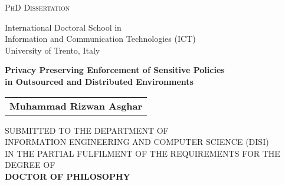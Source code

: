 \documentclass[epsfig,a4paper,11pt,titlepage]{book}
\newcommand{\clearemptydoublepage}{\newpage{\pagestyle{empty}\cleardoublepage}}
\numberwithin{algorithm}{chapter}
\newenvironment{changemargin}[3]{\begin{list}{}{\setlength{\topsep}{0pt}\setlength{\leftmargin}{#1}\setlength{\rightmargin}{#2}\setlength{\topmargin}{#3}\setlength{\listparindent}{\parindent}\setlength{\itemindent}{\parindent}\setlength{\parsep}{\parskip}}\item[]}{\end{list}}
\begin{document}
\newpage
\clearemptydoublepage
\thispagestyle{empty}
\begin{changemargin}{-7mm}{-7mm}{0mm}
\begin{center}

\Large \textsc{PhD Dissertation} \\ \tiny

\hrulefill 


\begin{figure}[h!]
\vspace{4mm}
  \centerline{}
\end{figure}

\Large International Doctoral School in \\ Information and Communication Technologies (ICT) \\
\Large University of Trento, Italy \\

\vspace{7mm}

\LARGE\textbf{Privacy Preserving Enforcement of Sensitive Policies \\ in Outsourced and Distributed Environments}

\vspace{2mm}

\begin{center}
\begin{tabular}{l}
\Large \textbf{Muhammad Rizwan Asghar} \\
\end{tabular}
\end{center}

\vspace{5mm}

{\normalsize \uppercase{
submitted to the Department of \\ Information Engineering and Computer Science (DISI) \\
in the partial fulfilment of the requirements for the degree of \\
\textbf{Doctor of Philosophy}
}
}

\vspace{13mm}


\end{center}
\end{changemargin}
\end{document}

